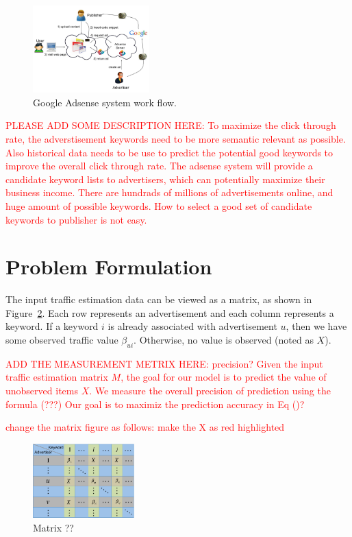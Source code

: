 \documentclass[conference,compsoc]{IEEEtran}
\begin{document}
\begin{figure}[!ht]
	\centering
 \includegraphics[width=0.4\textwidth]{figures/adsense.jpg}
    \caption{Google Adsense system work flow.}
    \label{fig:adsense}
\end{figure}


\textcolor{red}{  PLEASE ADD SOME DESCRIPTION HERE: 
To maximize the click through rate, the adverstisement keywords need to be more semantic relevant as possible.  Also historical data needs to be use to predict the potential good keywords to improve the overall click through rate. The adsense system will provide a candidate keyword lists to advertisers, which can potentially maximize their business income.  There are hundrads of millions of advertisements online, and huge amount of possible keywords. How to select a good set of candidate keywords to publisher is not easy. }

%
\section{Problem Formulation}
\label{sec:problem}

The input traffic estimation data can be viewed as a matrix, as shown in Figure~\ref{fig:problem-as-matrix}. Each row represents an advertisement and each column represents a keyword. If a keyword $i$ is already associated with advertisement $u$, then we have some observed traffic value $\beta_{ui}$. Otherwise, no value is observed (noted as $X$).

\textcolor{red}{ 
ADD THE MEASUREMENT METRIX HERE: precision? 
Given the input traffic estimation matrix $M$, the goal for our model is to predict the value of  unobserved items $X$. We measure the overall precision of prediction using the formula (???)
Our goal is to maximiz the prediction accuracy in Eq ()?
}

\textcolor{red}{ change the matrix figure as follows: make the X as red highlighted}
\begin{figure}[!ht]
	\centering
    \includegraphics[width=0.35\textwidth]{figures/matrix.pdf}
    \caption{Matrix ??}
    \label{fig:problem-as-matrix}
\end{figure}
\end{document}

